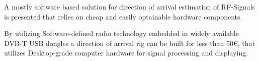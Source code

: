 A mostly software based solution for direction of arrival
estimation of RF-Signals is presented that relies on
cheap and easily optainable hardware components.

By utilizing Software-defined radio technology embedded
in widely available DVB-T USB dongles a direction of arrival
rig can be built for less than 50€, that utilizes Desktop-grade
computer hardware for signal processing and displaying.
